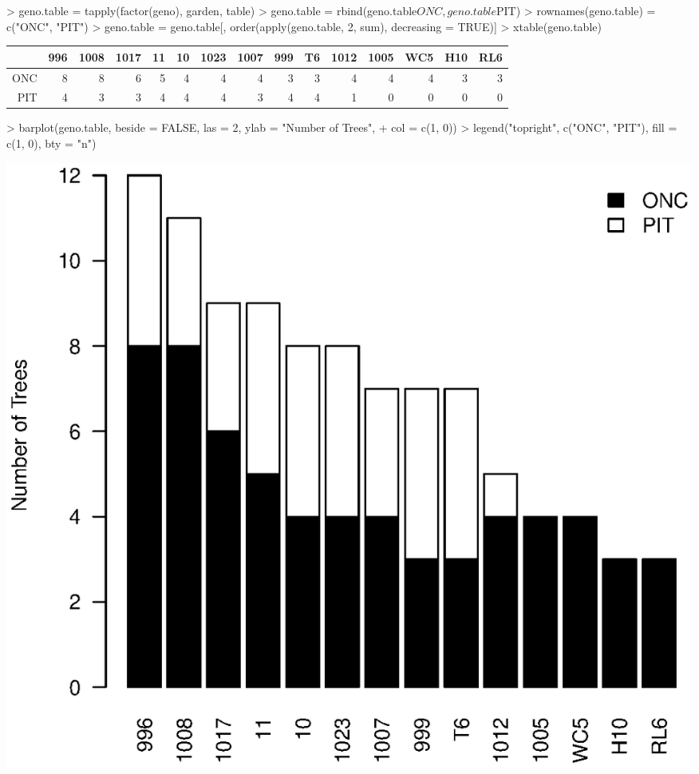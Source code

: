 \documentclass[11pt]{amsart}
\begin{document}
\begin{Schunk}
\begin{Sinput}
> geno.table = tapply(factor(geno), garden, table)
> geno.table = rbind(geno.table$ONC, geno.table$PIT)
> rownames(geno.table) = c("ONC", "PIT")
> geno.table = geno.table[, order(apply(geno.table, 2, sum), decreasing = TRUE)]
> xtable(geno.table)
\end{Sinput}
\begin{table}[ht]
\begin{center}
\begin{tabular}{rrrrrrrrrrrrrrr}
  \hline
 & 996 & 1008 & 1017 & 11 & 10 & 1023 & 1007 & 999 & T6 & 1012 & 1005 & WC5 & H10 & RL6 \\ 
  \hline
ONC &   8 &   8 &   6 &   5 &   4 &   4 &   4 &   3 &   3 &   4 &   4 &   4 &   3 &   3 \\ 
  PIT &   4 &   3 &   3 &   4 &   4 &   4 &   3 &   4 &   4 &   1 &   0 &   0 &   0 &   0 \\ 
   \hline
\end{tabular}
\end{center}
\end{table}\begin{Sinput}
> barplot(geno.table, beside = FALSE, las = 2, ylab = "Number of Trees", 
+     col = c(1, 0))
> legend("topright", c("ONC", "PIT"), fill = c(1, 0), bty = "n")
\end{Sinput}
\end{Schunk}
\includegraphics{LCO_analyses-009}
\end{document}
